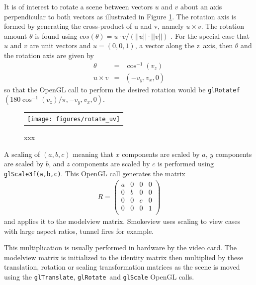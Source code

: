 \documentclass[11pt,twoside]{book}
\newcommand{\figoptions}{htp}
\begin{document}
It is of interest to rotate a scene between vectors $u$ and $v$ about an axis perpendicular to both vectors
as illustrated in Figure \ref{figrotateuv}.
The rotation axis is formed by generating the cross-product of u and v, namely $u\times v$.  The
rotation amount $\theta$ is found using $cos(\theta)=u\cdot v/(||u||\cdot ||v||)$ .  For the special case that $u$ and $v$ are unit vectors
and $u=(0,0,1)$, a vector along the z~axis, then $\theta$ and the rotation axis are given by
\begin{eqnarray*}
\theta&=&\cos^{-1}(v_z)\\
u\times v&=&(-v_y,v_x,0)
\end{eqnarray*}
so that the OpenGL call to perform the desired rotation would be {\tt glRotatef}$(180\cos^{-1}(v_z)/\pi,-v_y,v_x,0)$.

\begin{figure}[\figoptions]
\begin{center}
\begin{tabular}{c}
\texttt{[image: figures/rotate\_uv]}
\end{tabular}
\end{center}
\caption {xxx} \label{figrotateuv}
\end{figure}

A scaling of $(a,b,c)$ meaning that
$x$ components are scaled by $a$,
$y$ components are scaled by $b$,
and $z$ components are scaled by $c$
is performed using {\tt glScale3f(a,b,c)}.
This OpenGL call generates the matrix
\begin{eqnarray*}
R=\left(%
\begin{array}{cccc}
  a & 0 & 0 & 0 \\
  0 & b & 0 & 0 \\
  0 & 0 & c & 0 \\
  0 & 0 & 0 & 1 \\
\end{array}%
\right)
\end{eqnarray*}
and applies it to the modelview matrix.
Smokeview uses scaling to
view cases with large aspect ratios, tunnel fires for example.

This multiplication is usually performed in
hardware by the video card.  The modelview matrix is initialized
to the identity matrix then multiplied by these
translation, rotation or scaling transformation matrices as the scene is moved using
the {\tt glTranslate}, {\tt glRotate}\ and {\tt glScale} OpenGL
calls.
\end{document}
